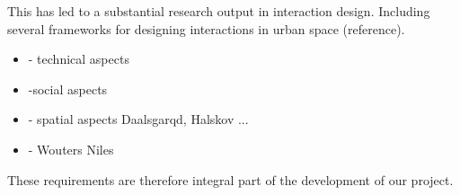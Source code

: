 This has led to a substantial research output in interaction design. Including several frameworks for designing interactions in urban space (reference).

\begin{itemize}
\item - technical aspects
\item -social aspects
\item - spatial aspects Daalsgarqd, Halskov ... 
\item - Wouters Niles
\end{itemize}




These requirements are therefore integral part of the development of our project. 



